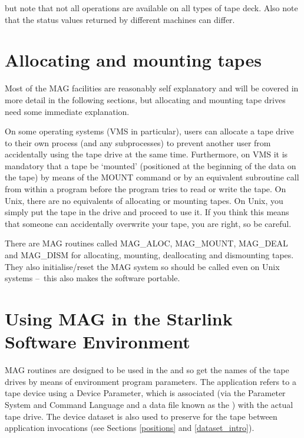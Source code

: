 \documentclass[11pt]{starlink}
\providecommand{\dash}{--}
\begin{document}
but note that not all operations are available on all types of tape deck.
Also note that the status values returned by different machines can differ.

\section{Allocating and mounting tapes}
Most of the MAG facilities are reasonably self explanatory and will be covered
in more detail in the following sections, but allocating and mounting tape
drives need some immediate explanation.

On some operating systems (VMS in particular), users can allocate a tape drive
to their own process (and any subprocesses) to prevent another user from
accidentally using the tape drive at the same time. Furthermore, on VMS it is
mandatory that a tape be `mounted' (positioned at the beginning of the data on
the tape) by means of the MOUNT command or by an equivalent subroutine call
from within a program before the program tries to read or write the tape. On
Unix, there are no equivalents of allocating or mounting tapes. On Unix, you
simply put the tape in the drive and proceed to use it. If you think this means
that someone can accidentally overwrite your tape, you are right, so be
careful.

There are MAG routines called MAG\_ALOC, MAG\_MOUNT, MAG\_DEAL and MAG\_DISM
for allocating, mounting, deallocating and dismounting tapes. They also
initialise/reset the MAG system so should be called even on Unix systems
\dash\ this also makes the software portable.

\section{Using MAG in the Starlink Software Environment}
MAG routines are designed to be used in the
and so get the names of the tape drives by means of environment program
parameters. The application refers to a tape device using a Device Parameter,
which is associated (via the Parameter System and Command Language and a data
file known as the
) with the actual tape drive.
The device dataset is also used to preserve
for the tape between application
invocations (see Sections \ref{positions} and \ref{dataset_intro}).
\end{document}
